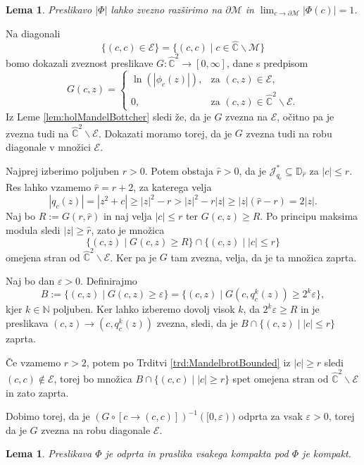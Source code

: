\documentclass[12pt,a4paper]{amsart}
\theoremstyle{definition} %
\theoremstyle{plain} %
\newtheorem{lema}[definicija]{Lema}
\newcommand{\N}{\mathbb N}
\newcommand{\CC}{\mathbb C}
\newcommand{\CCinf} {\hat{\CC}} %
\newcommand{\D}{\mathbb D} %
\newcommand{\M}{\mathscr M} %
\newcommand{\J}{\mathscr J} %
\newcommand{\E}{\mathscr E} %
\begin{document}
\begin{lema}\label{lem:expMandelBottcher}
Preslikavo $|\Phi|$ lahko zvezno razširimo na $\partial\M$ in $\lim_{c\to\partial\M}|\Phi(c)| = 1$.
\end{lema}

\proof
Na diagonali 
$$\{(c, c) \in \E\} = \{(c, c) \mid c \in \CCinf \smallsetminus \M\}$$
bomo dokazali zveznost preslikave $G \colon \CCinf^2 \to [0, \infty]$, dane s predpisom
\begin{equation*}
    G(c, z)= 
\begin{cases}
    \ln(|\phi_c(z)|), & \text{za } (c, z) \in \E, \\
    0,                      & \text{za } (c, z) \in \CCinf^2 \smallsetminus \E .
\end{cases}
\end{equation*}
Iz Leme \ref{lem:holMandelBottcher} sledi že, da je $G$ zvezna na $\E$,
očitno pa je zvezna tudi na $\CCinf^2 \smallsetminus \E$.
Dokazati moramo torej, da je $G$ zvezna tudi na robu diagonale v množici $\E$.

Najprej izberimo poljuben $r>0$. 
Potem obstaja $\hat{r} > 0$, da je $\J_{q_c}^\ast \subseteq \D_{\hat{r}}$ za $|c| \leq r$.
Res lahko vzamemo $\hat{r} = r + 2$, za katerega velja
$$|q_c(z)| = |z^2 + c| \geq |z|^2 - r > |z|^2 - r|z| \geq |z|(\hat{r} - r) = 2|z|.$$
Naj bo $R := G(r, \hat{r})$ in naj velja $|c| \leq r$ ter $G(c, z) \geq R$. 
Po principu maksima modula sledi $|z| \geq \hat{r}$, zato je množica
$$\{(c, z) \mid G(c, z) \geq R\} \cap \{(c, z) \mid |c| \leq r\}$$
omejena stran od $\CCinf^2\smallsetminus\E$. Ker pa je $G$ tam zvezna, velja, da je ta množica zaprta.

Naj bo dan $\varepsilon > 0$. Definirajmo
$$B := \{(c, z) \mid G(c, z) \geq \varepsilon\} = \{(c, z) \mid G(c, q_c^k(z)) \geq 2^k\varepsilon\},$$
kjer $k\in\N$ poljuben. Ker lahko izberemo dovolj visok $k$, da 
$2^k \varepsilon \geq R$ in je preslikava $(c, z) \to (c, q_c^k(z))$ zvezna,
sledi, da je  $B \cap \{(c, z) \mid |c| \leq r\}$ zaprta.

Če vzamemo $r > 2$, potem po Trditvi \ref{trd:MandelbrotBounded} iz $|c| \geq r$ sledi $(c, c) \notin \E$, 
torej bo množica $B \cap \{(c, c) \mid |c| \geq r\}$ spet omejena stran od $\CCinf^2 \smallsetminus \E$ in zato zaprta.

Dobimo torej, da je $(G \circ [c \to (c, c)])^{-1}([0, \varepsilon))$
odprta za vsak $\varepsilon > 0$, torej da je $G$ zvezna na robu diagonale $\E$.
\endproof

\begin{lema}\label{lem:compactMandelBottcher}
Preslikava $\Phi$ je odprta in praslika vsakega kompakta pod $\Phi$ je kompakt.
\end{lema}
\end{document}
